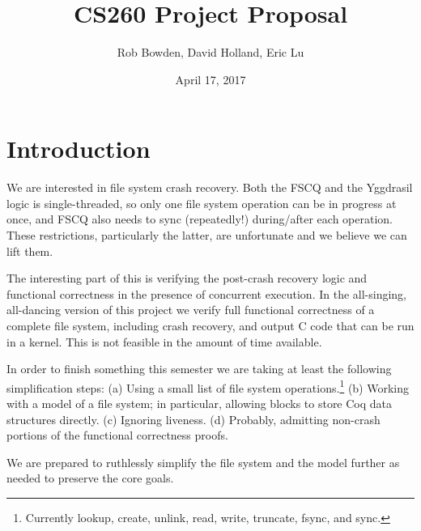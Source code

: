 \documentclass[11pt, twocolumn, letterpaper]{article}
\title{CS260 Project Proposal}
\author{Rob Bowden, David Holland, Eric Lu}
\date{April 17, 2017}
\begin{document}
\maketitle


\section{Introduction}

%

We are interested in
file system crash recovery.
Both the FSCQ and the Yggdrasil logic is single-threaded, so only
one file system operation can be in progress at once, and FSCQ also
needs to sync (repeatedly!) during/after each operation.
These restrictions, particularly the latter, are unfortunate
and we believe we can lift them.

The interesting part of this is verifying the post-crash recovery
logic and functional correctness in the presence of concurrent
execution.
In the all-singing, all-dancing version of this project we verify full
functional correctness of a complete file system, including crash
recovery, and output C code that can be run in a kernel.
This is not feasible in the amount of time available.

In order to finish something this semester we are
taking at least the following simplification steps:
(a) Using a small list of file system operations.\footnote{Currently
lookup, create, unlink, read, write, truncate, fsync, and sync.}
(b) Working with a model of a file system; in particular, allowing
      blocks to store Coq data structures directly.
(c) Ignoring liveness.
(d) Probably, admitting non-crash portions of the functional
      correctness proofs.

We are prepared to ruthlessly simplify the file system and the model
further as needed to preserve the core goals.

%
\end{document}
